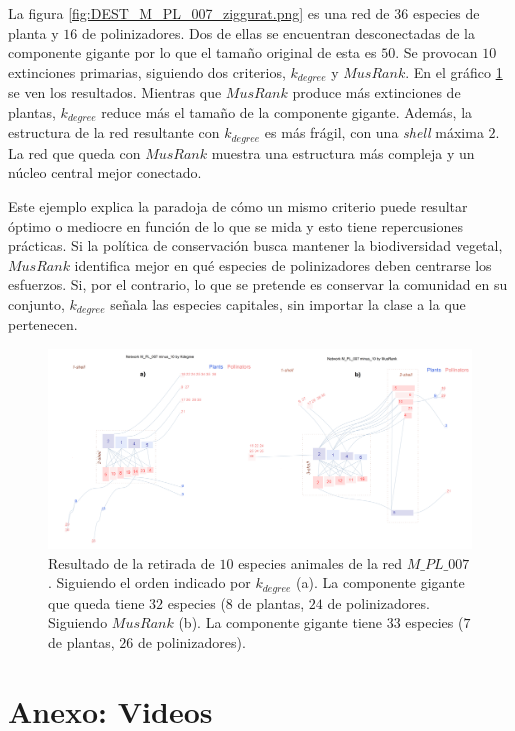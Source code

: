 La figura \ref{fig:DEST_M_PL_007_ziggurat.png} es una red de $36$ especies de planta y $16$ de polinizadores. Dos de ellas se encuentran desconectadas de la componente gigante por lo que el tamaño original de esta es $50$. Se provocan $10$ extinciones primarias, siguiendo dos criterios, ${k}_{degree}$ y $MusRank$. En el gráfico \ref{fig:DEST_destruccion_PL007.png} se ven los resultados. Mientras que $MusRank$ produce más extinciones de plantas, ${k}_{degree}$ reduce más el tamaño de la componente gigante. Además, la estructura de la red resultante con ${k}_{degree}$ es más frágil, con una \textit{shell} máxima $2$. La red que queda con $MusRank$ muestra una estructura más compleja y un núcleo central mejor conectado.

Este ejemplo explica la paradoja de cómo un mismo criterio puede resultar óptimo o mediocre en función de lo que se mida y esto tiene repercusiones prácticas. Si la política de conservación busca mantener la biodiversidad vegetal, $MusRank$  identifica mejor en qué especies de polinizadores deben
centrarse los esfuerzos. Si, por el contrario, lo que se pretende es conservar la comunidad en su conjunto, ${k}_{degree}$ señala las especies capitales, sin importar la clase a la que pertenecen.

\begin{figure}[htp!]
\centering
\includegraphics[scale=0.26]{Figures/DEST_destruccion_PL007.png}
\caption {Resultado de la retirada de $10$ especies animales de la red $M\_PL\_007$. Siguiendo el orden indicado por ${k}_{degree}$ (a). La componente gigante que queda tiene $32$ especies ($8$ de plantas, $24$ de polinizadores. Siguiendo $MusRank$ (b). La componente gigante tiene $33$ especies ($7$ de plantas, $26$ de polinizadores).}
\label{fig:DEST_destruccion_PL007.png}
\end{figure}

\section{Anexo: Videos}
\label{DES_ANEXO_videos}


